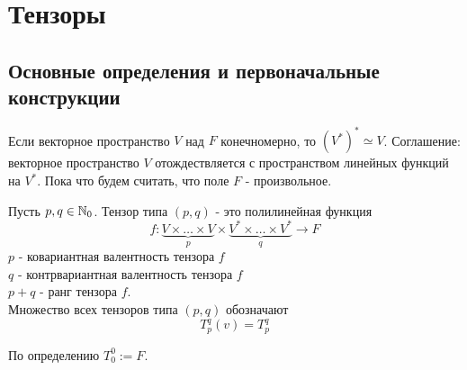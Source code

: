 \section{Тензоры}
\subsection{Основные определения и первоначальные конструкции}
Если векторное пространство $V$ над $F$ конечномерно, то $(V^*)^*\simeq V$. Соглашение: векторное пространство $V$ отождествляется с пространством линейных функций на $V^*$.
Пока что будем считать, что поле $F$ - произвольное.
\begin{definition}
    Пусть $p,q\in \mathbb{N}_0$. Тензор типа $(p,q)$ - это полилинейная функция 
    \[f: \underbrace{V\times \dots\times V}_p \times \underbrace{V^*\times \dots\times V^*}_q \to F\]
    $p$ - ковариантная валентность тензора $f$\\
    $q$ - контрвариантная валентность тензора $f$ \\
    $p+q$ - ранг тензора $f$. \\
    Множество всех тензоров типа $(p,q)$ обозначают 
    \[T^q_p(v)=T^q_p\]
\end{definition} 
По определению $T_0^0 := F$.
